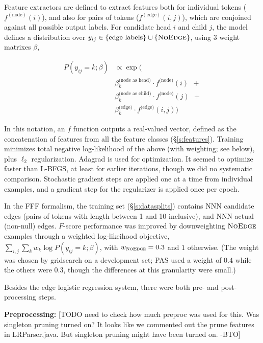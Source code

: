 \documentclass[11pt]{article}
\newcommand{\bocomment}[1]{\textcolor{Bittersweet}{[#1 -BTO]}}
\begin{document}
Feature extractors are defined to extract features both for individual tokens ($f^{(\text{node})}(i)$), and also for pairs of tokens ($f^{(\text{edge})}(i,j)$), which are conjoined against all possible output labels.
For candidate head $i$ and child $j$, the model defines a distribution over
$y_{ij} \in \{\text{edge labels}\} \cup \{\textsc{NoEdge}\}$, using $3$ weight matrixes $\beta$,

\begin{align*} 
  P(y_{ij}=k; \beta) & \propto 
  \exp \big( \\
  &
  \beta^{\text{(node as head)}}_k \cdot f^{\text{(node)}}(i)
  \ \ + \\ 
  &
  \beta^{\text{(node as child)}}_k \cdot f^{\text{(node)}}(j)
  \ \ + \\
  &
  \beta^{\text{(edge)}}_k \cdot f^{\text{(edge)}}(i,j)
    \big)
\end{align*}

\noindent
In this notation, an $f$ function outputs a real-valued vector, defined as the concatenation of features from all the feature classes (\S\ref{s:features}).
Training minimizes total negative log-likelihood of the above (with weighting; see below),
plus $\ell_2$ regularization.  Adagrad \cite{duchi2011adaptive} is used for optimization.
It seemed to optimize faster than L-BFGS, at least for earlier iterations, though we did no systematic comparison. Stochastic gradient steps are applied one at a time from individual examples, and a gradient step for the regularizer is applied once per epoch.

In the FFF formalism, the training set (\S\ref{s:datasplits})
contains NNN candidate edges (pairs of tokens with length between 1 and 10 inclusive),
and NNN actual (non-null) edges.  $F$-score performance was improved by downweighting $\textsc{NoEdge}$ examples through a weighted log-likeihood objective,
$\sum_{i,j} \sum_k w_k \log P(y_{ij}=k;\beta)$,
with $w_{\textsc{NoEdge}}=0.3$ and $1$ otherwise.  
(The weight was chosen by gridsearch on a development set; 
PAS used a weight of $0.4$ while the others were $0.3$, though the differences at this granularity were small.)

Besides the edge logistic regression system, there were both pre- and post-processing steps.

\textbf{Preprocessing:}
\bocomment{TODO need to check how much preproc was used for this.  Was singleton pruning turned on?  It looks like we commented out the prune features in LRParser.java.  But singleton pruning might have been turned on.}
\end{document}
